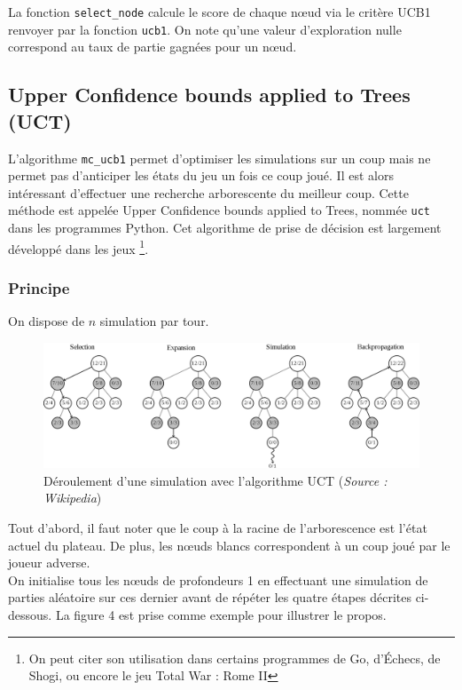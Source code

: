 \documentclass[a4paper]{article}
\theoremstyle{definition}
\begin{document}
La fonction \texttt{select\_node} calcule le score de chaque nœud via le critère UCB1 renvoyer par la fonction  \texttt{ucb1}. On note qu'une valeur d'exploration nulle correspond au taux de partie gagnées pour un nœud.

\subsection{Upper Confidence bounds applied to Trees (UCT)}

L'algorithme \texttt{mc\_ucb1} permet d'optimiser les simulations sur un coup mais ne permet pas d'anticiper les états du jeu un fois ce coup joué. Il est alors intéressant d'effectuer une recherche arborescente du meilleur coup. Cette méthode est appelée Upper Confidence bounds applied to Trees, nommée \texttt{uct} dans les programmes Python. Cet algorithme de prise de décision est largement développé dans les jeux \footnote{On peut citer son utilisation dans certains programmes de Go, d'Échecs, de Shogi, ou encore le jeu Total War : Rome II}.

\subsubsection{Principe}

On dispose de $n$ simulation par tour.
\begin{figure}[h]
\centering
\includegraphics[scale=0.18]{MCTS_wikipedia.png}
\caption{Déroulement d'une simulation avec l'algorithme UCT (\textit{Source : Wikipedia})}
\label{fig:uct}
\end{figure}

Tout d'abord, il faut noter que le coup à la racine de l'arborescence est l'état actuel du plateau. De plus, les nœuds blancs correspondent à un coup joué par le joueur adverse.\\
On initialise tous les nœuds de profondeurs 1 en effectuant une simulation de parties aléatoire sur ces dernier avant de répéter les quatre étapes décrites ci-dessous. La figure 4 est prise comme exemple pour illustrer le propos.\\
\end{document}
